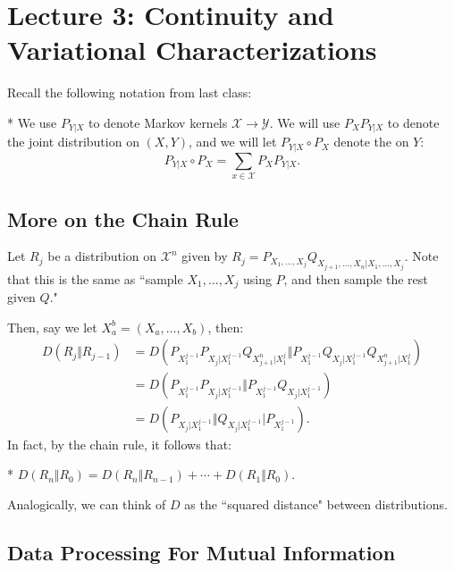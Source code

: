 \section*{Lecture 3: Continuity and Variational Characterizations}
\setcounter{section}{3}
\setcounter{subsection}{0}
\setcounter{defn}{0}
\setcounter{defncontainer}{0}

Recall the following notation from last class:

\begin{defn}*
	We use $P_{Y|X}$ to denote Markov kernels $\mathcal X\to \mathcal Y$. We will use $P_XP_{Y|X}$ to denote the joint distribution on $(X,Y)$, and we will let $P_{Y|X}\circ P_X$ denote the  on $Y$:
	\[
		P_{Y|X} \circ P_X = \sum_{x\in \mathcal X} P_X P_{Y|X}.
	\]
\end{defn}

\subsection{More on the Chain Rule}

Let $R_j$ be a distribution on $\mathcal X^n$ given by $R_j = P_{X_1,\ldots, X_j} Q_{X_{j+1}, \ldots, X_n | X_1, \ldots, X_j}$. Note that this is the same as ``sample $X_1,\ldots, X_j$ using $P$, and then sample the rest given $Q$."

Then, say we let $X_a^b = (X_a, \ldots, X_b)$, then:\begin{align*}
	D(R_j\Vert R_{j-1}) &= D(P_{X_1^{j-1}} P_{X_j | X_1^{j-1}} Q_{X_{j+1}^n | X_1^j}\Vert P_{X_1^{j-1}} Q_{X_j|X_1^{j-1}} Q_{X_{j+1}^n | X_1^j})\\
	&= D(P_{X_1^{j-1}} P_{X_j | X_1^{j-1}} \Vert P_{X_1^{j-1}} Q_{X_j | X_1^{j-1}}) \\
	&= D(P_{X_j | X_1^{j-1}} \Vert Q_{X_j | X_1^{j-1}} | P_{X_1^{j-1}}).
\end{align*}
In fact, by the chain rule, it follows that:

\begin{fact}*
	$D(R_n \Vert R_0) = D(R_n\Vert R_{n-1}) + \cdots + D(R_1\Vert R_0)$.
\end{fact}

Analogically, we can think of $D$ as the ``squared distance" between distributions.

\subsection{Data Processing For Mutual Information}


